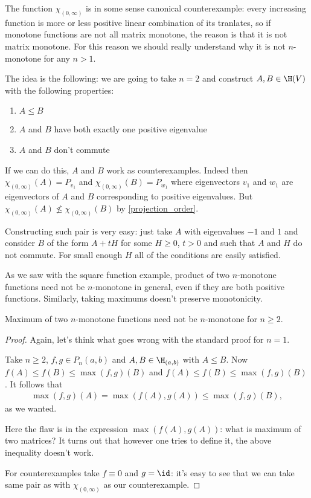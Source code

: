 The function $\chi_{(0, \infty)}$ is in some sense canonical counterexample: every increasing function is more or less positive linear combination of its tranlates, so if monotone functions are not all matrix monotone, the reason is that it is not matrix monotone. For this reason we should really understand why it is not $n$-monotone for any $n > 1$.

The idea is the following: we are going to take $n = 2$ and construct $A, B \in \H(V)$ with the following properties:
\begin{enumerate}
	\item $A \leq B$
	\item $A$ and $B$ have both exactly one positive eigenvalue
	\item $A$ and $B$ don't commute
\end{enumerate}
If we can do this, $A$ and $B$ work as counterexamples. Indeed then $\chi_{(0, \infty)}(A) = P_{v_{1}}$ and $\chi_{(0, \infty)}(B) = P_{w_{1}}$ where eigenvectors $v_{1}$ and $w_{1}$ are eigenvectors of $A$ and $B$ corresponding to positive eigenvalues. But $\chi_{(0, \infty)}(A) \not\leq \chi_{(0, \infty)}(B)$ by \ref{projection_order}.

Constructing such pair is very easy: just take $A$ with eigenvalues $-1$ and $1$ and consider $B$ of the form $A + t H$ for some $H \geq 0$, $t > 0$ and such that $A$ and $H$ do not commute. For small enough $H$ all of the conditions are easily satisfied.

As we saw with the square function example, product of two $n$-monotone functions need not be $n$-monotone in general, even if they are both positive functions. Similarly, taking maximums doesn't preserve monotonicity.

\begin{prop}
	Maximum of two $n$-monotone functions need not be $n$-monotone for $n \geq 2$.
\end{prop}
\begin{proof}
	Again, let's think what goes wrong with the standard proof for $n = 1$.

	Take $n \geq 2$, $f, g \in P_{n}(a, b)$ and $A, B \in \H_{(a, b)}$ with $A \leq B$. Now $f(A) \leq f(B) \leq \max(f, g)(B)$ and $f(A) \leq f(B) \leq \max(f, g)(B)$. It follows that
	\begin{align*}
		\max(f, g)(A) = \max(f(A), g(A)) \leq \max(f, g)(B),
	\end{align*}
	as we wanted.

	Here the flaw is in the expression $\max(f(A), g(A))$: what is maximum of two matrices? It turns out that however one tries to define it, the above inequality doesn't work.

	For counterexamples take $f \equiv 0$ and $g = \id$: it's easy to see that we can take same pair as with $\chi_{(0, \infty)}$ as our counterexample.
\end{proof}

